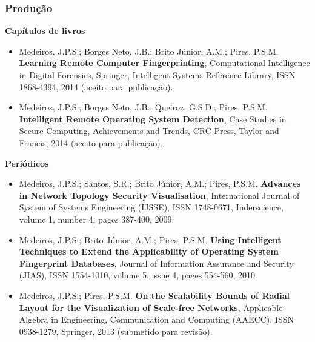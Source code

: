\documentclass[10pt]{beamer}
\newcommand\fontvii{\fontsize{8}{7.2}\selectfont}
\begin{document}
\begin{frame}
    \frametitle{Produção}\fontvii

{\bf Capítulos de livros}

\begin{itemize}
\item Medeiros, J.P.S.; Borges Neto, J.B.; Brito Júnior, A.M.; Pires, P.S.M.
    {\bf Learning Remote Computer Fingerprinting},
    Computational Intelligence in Digital Forensics, Springer, Intelligent
    Systems Reference Library, ISSN 1868-4394, 2014 (aceito para publicação).
\item Medeiros, J.P.S.; Borges Neto, J.B.; Queiroz, G.S.D.; Pires, P.S.M.
    {\bf Intelligent Remote Operating System Detection}, Case Studies in
    Secure Computing, Achievements and Trends, CRC Press, Taylor and Francis,
    2014 (aceito para publicação).
\end{itemize}

{\bf Periódicos}

\begin{itemize}
\item Medeiros, J.P.S.; Santos, S.R.; Brito Júnior, A.M.; Pires, P.S.M.
    {\bf Advances in Network Topology Security Visualisation}, International
    Journal of System of Systems Engineering (IJSSE), ISSN 1748-0671,
    Inderscience, volume 1, number 4, pages 387-400, 2009.
\item Medeiros, J.P.S.; Brito Júnior, A.M.; Pires, P.S.M.
    {\bf Using Intelligent Techniques to Extend the Applicability of
    Operating System Fingerprint Databases}, Journal of Information Assurance
    and Security (JIAS), ISSN 1554-1010, volume 5, issue 4, pages 554-560,
    2010.
\item Medeiros, J.P.S.; Pires, P.S.M.
    {\bf On the Scalability Bounds of Radial Layout for the Visualization of
    Scale-free Networks},
    Applicable Algebra in Engineering, Communication and Computing (AAECC),
    ISSN 0938-1279, Springer, 2013 (submetido para revisão).
\end{itemize}

\end{frame}
\end{document}
